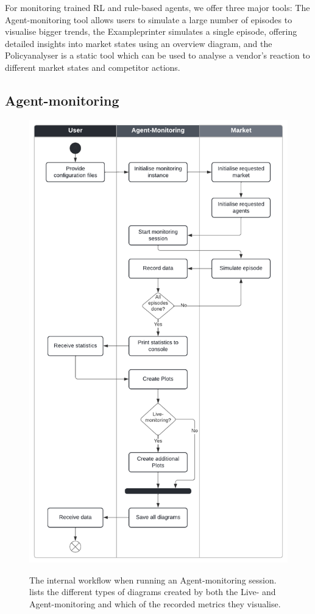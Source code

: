 For monitoring trained RL and rule-based agents, we offer three major tools: The Agent-monitoring tool allows users to simulate a large number of episodes to visualise bigger trends, the Exampleprinter simulates a single episode, offering detailed insights into market states using an overview diagram, and the Policyanalyser is a static tool which can be used to analyse a vendor's reaction to different market states and competitor actions.

\subsection{Agent-monitoring}\label{subsec:AgentMonitoring}

\begin{figure}
	\centering
	\includegraphics[height = 0.9\textheight]{images/swimlane_monitoring.pdf}\\
	\caption{The internal workflow when running an Agent-monitoring session.  lists the different types of diagrams created by both the Live- and Agent-monitoring and which of the recorded metrics they visualise.}\label{fig:SwimlaneMonitoring}
\end{figure}

